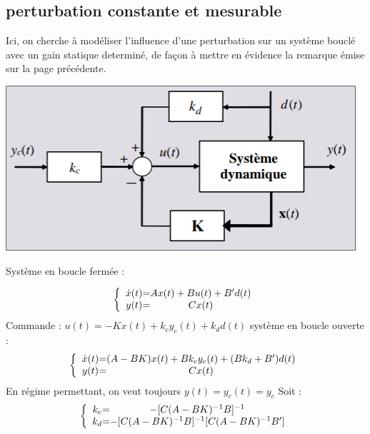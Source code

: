 {{\subsection{perturbation constante et mesurable}
\large{
Ici, on cherche à modéliser l'influence d'une perturbation sur un système bouclé avec un gain statique determiné, de façon à mettre en évidence la remarque émise sur la page précédente.
\begin{center}
    \includegraphics[scale=0.5]{Pics/Perturbations.png}
\end{center}
\large{Système en boucle fermée :}
}
\Large{
    \[
\left \{
\begin{array}{c @{=} c}
    \dot x(t) & Ax(t) + Bu(t) + B'd(t)\\
    y(t) & Cx(t)
\end{array}
\right.
\]
\large{Commande :} \newline
$u(t) = -Kx(t) + k_{c}y_{c}(t) + k_{d}d(t)$
\large{système en boucle ouverte :}
\Large{
    \[
\left \{
\begin{array}{c @{=} c}
    \dot x(t) & (A - BK)x(t) + Bk_{c}y_{c}(t) + (Bk_{d} + B')d(t)\\
    y(t) & Cx(t)
\end{array}
\right.
\]
\large{En régime permettant, on veut toujours $y(t) = y_{c}(t) = y_{c}$ \newline
Soit :}
\Large{
    \[
\left \{
\begin{array}{c @{=} c}
    k_{c} & -[C(A - BK)^{-1}B]^{-1}\\
    k_{d} & -[C(A - BK)^{-1}B]^{-1}[C(A - BK)^{-1}B']
\end{array}
\right.
    \]}
\newpage
}}}}
